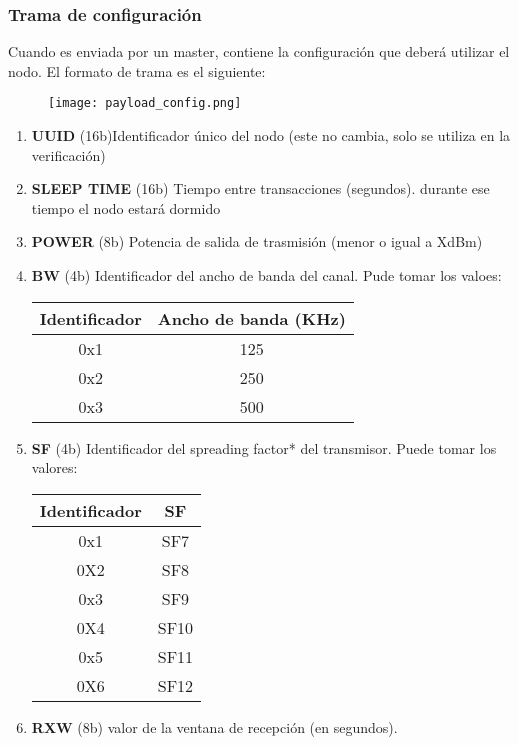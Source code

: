 \subsubsection{Trama de configuración}
	
	
	Cuando es enviada por un master, contiene la configuración que deberá utilizar el nodo. El formato de trama es el siguiente:
	
	\begin{figure}[!h]
		\texttt{[image: payload\_config.png]}
		\centering
	\end{figure}
	
	\begin{enumerate}
		\item \textbf{UUID } (16b)Identificador único del nodo (este no cambia, solo se utiliza en la verificación)
		\item \textbf{SLEEP TIME } (16b) Tiempo entre transacciones (segundos). durante ese tiempo el nodo estará dormido
		\item \textbf{POWER } (8b) Potencia de salida de trasmisión (menor o igual a XdBm)
		\item \textbf{BW } (4b) Identificador del ancho de banda del canal. Pude tomar los valoes:
		\begin{center}
			\begin{tabular}{| c c |}
				\hline
				Identificador & Ancho de banda (KHz) \\
				\hline \hline
				0x1 & 125\\
				0x2 & 250 \\
				0x3 & 500 \\
				\hline
		
			\end{tabular}
		\end{center}

		\item \textbf{SF} (4b) Identificador del spreading factor* del transmisor. Puede tomar los valores:
		\begin{center}
			\begin{tabular}{|c c|}
				\hline
				Identificador & SF \\
				\hline \hline
				0x1 & SF7 \\
				0X2 & SF8 \\
				0x3 & SF9 \\
				0X4 & SF10 \\
				0x5 & SF11 \\
				0X6 & SF12 \\
				\hline
			\end{tabular}
		\end{center}
		
		\item \textbf{RXW} (8b) valor de la ventana de recepción (en segundos).
	\end{enumerate}
	

